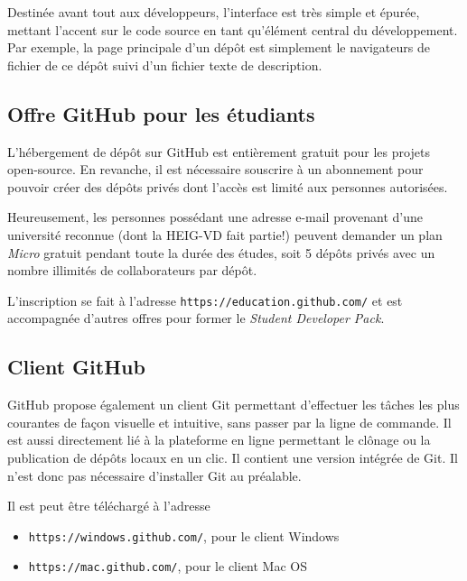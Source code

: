 \documentclass[11pt,a4paper]{article}
\begin{document}
Destinée avant tout aux développeurs, l'interface est très simple et épurée, mettant l'accent sur le code source en tant qu'élément central du développement. Par exemple, la page principale d'un dépôt est simplement le navigateurs de fichier de ce dépôt suivi d'un fichier texte de description.

\subsection{Offre GitHub pour les étudiants}

L'hébergement de dépôt sur GitHub est entièrement gratuit pour les projets open-source.
En revanche, il est nécessaire souscrire à un abonnement pour pouvoir créer des dépôts privés dont l'accès est limité aux personnes autorisées.

Heureusement, les personnes possédant une adresse e-mail provenant d'une université reconnue (dont la HEIG-VD fait partie!) peuvent demander un plan \textit{Micro} gratuit pendant toute la durée des études, soit 5 dépôts privés avec un nombre illimités de collaborateurs par dépôt.

L'inscription se fait à l'adresse {\tt https://education.github.com/} et est accompagnée d'autres offres pour former le {\it Student Developer Pack}.

\subsection{Client GitHub}

GitHub propose également un client Git permettant d'effectuer les tâches les plus courantes de façon visuelle et intuitive, sans passer par la ligne de commande.
Il est aussi directement lié à la plateforme en ligne permettant le clônage ou la publication de dépôts locaux en un clic.
Il contient une version intégrée de Git. Il n'est donc pas nécessaire d'installer Git au préalable.

Il est peut être téléchargé à l'adresse

\begin{itemize}
	\item {\tt https://windows.github.com/}, pour le client Windows
	\item {\tt https://mac.github.com/}, pour le client Mac OS
\end{itemize}
\end{document}
